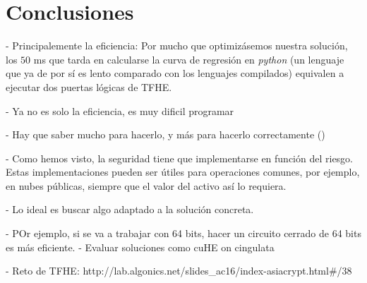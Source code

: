 \chapter{Conclusiones}
\label{chap:conclusiones}

- Principalemente la eficiencia: Por mucho que optimizásemos nuestra solución, los $50$ ms que tarda en calcularse la curva de regresión en \textit{python} (un lenguaje que ya de por sí es lento comparado con los lenguajes compilados) equivalen a ejecutar dos puertas lógicas de TFHE.


- Ya no es solo la eficiencia, es muy dificil programar

- Hay que saber mucho para hacerlo, y más para hacerlo correctamente (\cite{peng_danger_2019})

- Como hemos visto, la seguridad tiene que implementarse en función del riesgo. Estas implementaciones pueden ser útiles para operaciones comunes, por ejemplo, en nubes públicas, siempre que el valor del activo así lo requiera.


- Lo ideal es buscar algo adaptado a la solución concreta.

    - POr ejemplo, si se va a trabajar con 64 bits, hacer un circuito cerrado de 64 bits es más eficiente.
- Evaluar soluciones como cuHE on cingulata


- Reto de TFHE: http://lab.algonics.net/slides_ac16/index-asiacrypt.html#/38
